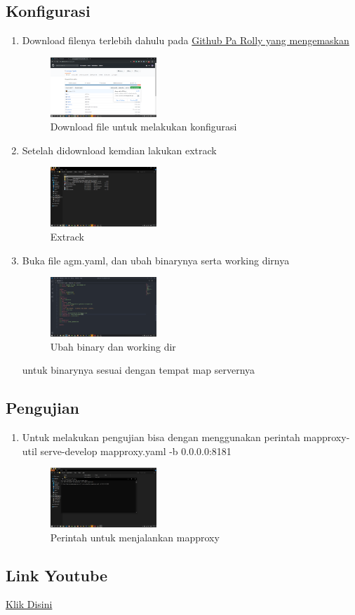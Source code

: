 \subsection{Konfigurasi}
\begin{enumerate}
    \item Download filenya terlebih dahulu pada \href{https://github.com/awangga/gede}{Github Pa Rolly yang mengemaskan}
    \hfill\break
    \begin{figure}[H]
		\includegraphics[width=4cm]{figures/1174027/5/3.png}
		\centering
		\caption{Download file untuk melakukan konfigurasi}
    \end{figure}
    \item Setelah didownload kemdian lakukan extrack
    \hfill\break
    \begin{figure}[H]
		\includegraphics[width=4cm]{figures/1174027/5/4.png}
		\centering
		\caption{Extrack}
    \end{figure}
    \item Buka file agm.yaml, dan ubah binarynya serta working dirnya
    \hfill\break
    \begin{figure}[H]
		\includegraphics[width=4cm]{figures/1174027/5/5.png}
		\centering
		\caption{Ubah binary dan working dir}
    \end{figure}
    untuk binarynya sesuai dengan tempat map servernya
\end{enumerate}
\subsection{Pengujian}
\begin{enumerate}
    \item Untuk melakukan pengujian bisa dengan menggunakan perintah mapproxy-util serve-develop mapproxy.yaml -b 0.0.0.0:8181
    \hfill\break
    \begin{figure}[H]
		\includegraphics[width=4cm]{figures/1174027/5/6.png}
		\centering
		\caption{Perintah untuk menjalankan mapproxy}
    \end{figure}
\end{enumerate}
\subsection{Link Youtube}
\href{}{Klik Disini}